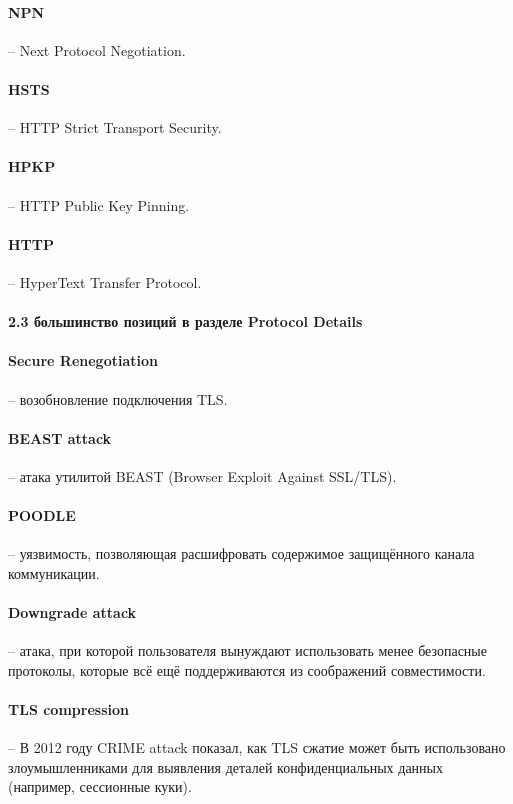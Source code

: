 \documentclass[10pt,a4paper]{article}
\begin{document}
\paragraph{NPN} -- Next Protocol Negotiation.

\paragraph{HSTS} -- HTTP Strict Transport Security.

\paragraph{HPKP} -- HTTP Public Key Pinning.

\paragraph{HTTP} -- HyperText Transfer Protocol.


\paragraph{2.3  большинство позиций в разделе Protocol Details}

\paragraph{Secure Renegotiation} -- возобновление подключения TLS.

\paragraph{BEAST attack} --  атака утилитой BEAST (Browser Exploit Against SSL/TLS).

\paragraph{POODLE} -- уязвимость, позволяющая расшифровать содержимое защищённого канала коммуникации.

\paragraph{Downgrade attack} -- атака, при которой пользователя вынуждают использовать менее безопасные протоколы, которые всё ещё поддерживаются из соображений совместимости.

\paragraph{TLS compression} -- В 2012 году CRIME attack показал, как TLS сжатие может быть использовано злоумышленниками для выявления деталей конфиденциальных данных (например, сессионные куки).
\end{document}
